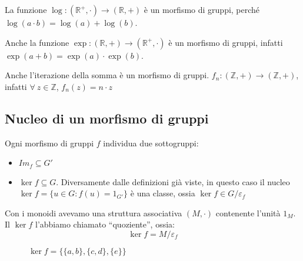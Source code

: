 \begin{exmp} 
La funzione $\log : (\mathbb{R}^{+}, \cdot) \to (\mathbb{R}, +)$ \`e un morfismo di gruppi, perch\'e $\log(a \cdot b) = \log(a) + \log(b)$.

Anche la funzione $\exp : (\mathbb{R}, +) \to (\mathbb{R}^{+}, \cdot)$ \`e un morfismo di gruppi, infatti  $\exp(a + b) = \exp(a) \cdot \exp(b)$.

Anche l'iterazione della somma \`e un morfismo di gruppi. $f_n : (\mathbb{Z}, +) \to (\mathbb{Z}, +) $, infatti $\forall \ z \in \mathbb{Z}$, $f_n(z) = n \cdot z$
\end{exmp}

\subsection{Nucleo di un morfismo di gruppi}

Ogni morfismo di gruppi $f$ individua due sottogruppi:
\begin{itemize}
    \item $Im_f \subseteq G'$
    \item $\ker f \subseteq G$. Diversamente dalle definizioni gi\`a viste, in questo caso il nucleo $\ker f = \{ u \in G : f(u) = 1_{G'}\}$ \`e una classe, ossia $\ker f \in G / \varepsilon_f$
\end{itemize}

Con i monoidi avevamo una struttura associativa $(M, \cdot)$ contenente l'unit\`a $1_M$. Il $\ker f$ l'abbiamo chiamato ``quoziente'', ossia:
\[
\ker f = M / \varepsilon_f
\]

\begin{figure}[ht]
\centering
{}
\caption{\label{fig:esempio_funzione}$\ker f = \{ \{a, b \}, \{ c, d \}, \{ e \}\}$ }
\end{figure}

